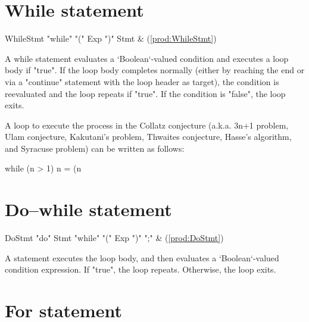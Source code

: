 \section{While statement}

\begin{bbgrammar}
           WhileStmt \: \xcd"while" \xcd"(" Exp \xcd")" Stmt & (\ref{prod:WhileStmt}) \\
\end{bbgrammar}

A while statement evaluates a \xcd`Boolean`-valued condition and executes a
loop body if \xcd"true". If the loop body completes normally (either by
reaching the end or via a \xcd"continue" statement with the loop header as
target), the condition is reevaluated and the loop repeats if \xcd"true". If
the condition is \xcd"false", the loop exits.

\begin{ex}
A loop to execute the process in the Collatz conjecture (a.k.a. 3n+1 problem,
Ulam conjecture, Kakutani's problem, Thwaites conjecture, Hasse's algorithm,
and Syracuse problem) can be written as follows:
\begin{xten}
  while (n > 1) {
     n = (n %
  }
\end{xten}
\end{ex}
\section{Do--while statement}

\begin{bbgrammar}
              DoStmt \: \xcd"do" Stmt \xcd"while" \xcd"(" Exp \xcd")" \xcd";" & (\ref{prod:DoStmt}) \\
\end{bbgrammar}


A  statement executes the loop body, and then evaluates a
\xcd`Boolean`-valued condition expression. If \xcd"true", the loop repeats.
Otherwise, the loop exits.


\section{For statement}


